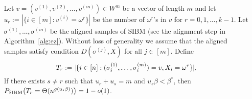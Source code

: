 \documentclass{article}
\begin{document}
\begin{lemma}  \label{lm:cvs}
	Let $v=(v^{(1)},v^{(2)},\dots,v^{(m)})\in W^m$ be a vector of length $m$
	and let $u_r:=|\{i\in[m]:v^{(i)}=\omega^r\}|$ be the number of $\omega^r$'s in $v$ for $r=0,1,\dots, k-1$.
	Let $\sigma^{(1)},\dots,\sigma^{(m)}$ be the aligned samples of SIBM (see the alignment step in Algorithm~\ref{alg:ez}).
	Without loss of generality we assume that the aligned samples satisfy condition $D(\sigma^{(j)}, X)$ for all $j\in[m]$.
	Define 
	\begin{equation}  \label{eq:rl}
	T_r:= | \{i\in[n]:(\sigma_i^{(1)},\dots,\sigma_i^{(m)})=v, X_i=\omega^r \} | ,  \\
	\end{equation}
	If there exists $s \neq r$ such that $u_r + u_s = m$ and $u_s\beta<\beta^\ast$, then
	$P_{\operatorname{SIBM}}\big(T_r = \Theta(n^{g(u_s\beta)}) \big) = 1-o(1)$.
\end{lemma}
\end{document}
